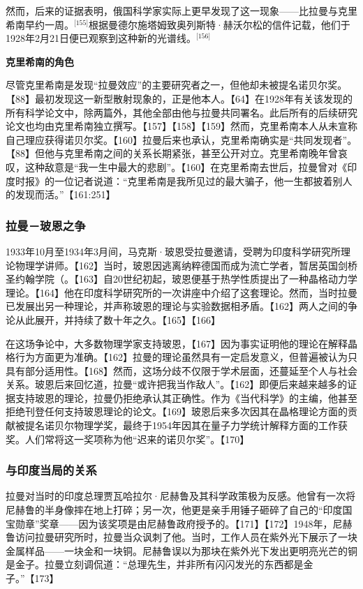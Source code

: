 然而，后来的证据表明，俄国科学家实际上更早发现了这一现象——比拉曼与克里希南早约一周。\(^\text{[155]}\)根据曼德尔施塔姆致奥列斯特·赫沃尔松的信件记载，他们于1928年2月21日便已观察到这种新的光谱线。\(^\text{[156]}\)

\textbf{克里希南的角色}

尽管克里希南是发现“拉曼效应”的主要研究者之一，但他却未被提名诺贝尔奖。【88】最初发现这一新型散射现象的，正是他本人。【64】在1928年有关该发现的所有科学论文中，除两篇外，其他全部由他与拉曼共同署名。此后所有的后续研究论文也均由克里希南独立撰写。【157】【158】【159】然而，克里希南本人从未宣称自己理应获得诺贝尔奖。【160】拉曼后来也承认，克里希南确实是“共同发现者”。【88】但他与克里希南之间的关系长期紧张，甚至公开对立。克里希南晚年曾哀叹，这种敌意是“我一生中最大的悲剧”。【160】在克里希南去世后，拉曼曾对《印度时报》的一位记者说道：“克里希南是我所见过的最大骗子，他一生都披着别人的发现而活。”【161:251】
\subsubsection{拉曼－玻恩之争}
1933年10月至1934年3月间，马克斯·玻恩受拉曼邀请，受聘为印度科学研究所理论物理学讲师。【162】当时，玻恩因逃离纳粹德国而成为流亡学者，暂居英国剑桥圣约翰学院（。【163】自20世纪初起，玻恩便基于热学性质提出了一种晶格动力学理论。【164】他在印度科学研究所的一次讲座中介绍了这套理论。然而，当时拉曼已发展出另一种理论，并声称玻恩的理论与实验数据相矛盾。【162】两人之间的争论从此展开，并持续了数十年之久。【165】【166】

在这场争论中，大多数物理学家支持玻恩，【167】因为事实证明他的理论在解释晶格行为方面更为准确。【162】拉曼的理论虽然具有一定启发意义，但普遍被认为只具有部分适用性。【168】然而，这场分歧不仅限于学术层面，还蔓延至个人与社会关系。玻恩后来回忆道，拉曼“或许把我当作敌人”。【162】即便后来越来越多的证据支持玻恩的理论，拉曼仍拒绝承认其正确性。作为《当代科学》的主编，他甚至拒绝刊登任何支持玻恩理论的论文。【169】玻恩后来多次因其在晶格理论方面的贡献被提名诺贝尔物理学奖，最终于1954年因其在量子力学统计解释方面的工作获奖。人们常将这一奖项称为他“迟来的诺贝尔奖”。【170】
\subsubsection{与印度当局的关系}
拉曼对当时的印度总理贾瓦哈拉尔·尼赫鲁及其科学政策极为反感。他曾有一次将尼赫鲁的半身像摔在地上打碎；另一次，他更是亲手用锤子砸碎了自己的“印度国宝勋章”奖章——因为该奖项是由尼赫鲁政府授予的。【171】【172】1948年，尼赫鲁访问拉曼研究所时，拉曼当众讽刺了他。当时，工作人员在紫外光下展示了一块金属样品——一块金和一块铜。尼赫鲁误以为那块在紫外光下发出更明亮光芒的铜是金子。拉曼立刻调侃道：“总理先生，并非所有闪闪发光的东西都是金子。”【173】

